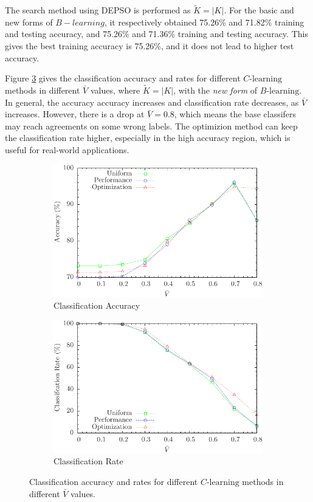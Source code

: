 The search method using DEPSO is performed as $\tilde{K}=|K|$. For the basic and new forms of $B-learning$, it respectively obtained 75.26\% and 71.82\% training and testing accuracy, and 75.26\% and 71.36\% training and testing accuracy. This gives the best training accuracy is 75.26\%, and it does not lead to higher test accuracy. 

Figure \ref{fig:threshoulds} gives the classification accuracy and rates for different $C\text{-learning}$ methods in different $\bar{V}$ values, where $\tilde{K}=|K|$, with the \emph{new form} of $B\text{-learning}$. In general, the accuracy accuracy increases and classification rate decreases, as $\bar{V}$ increases. However, there is a drop at $\bar{V}=0.8$, which means the base classifers may reach agreements on some wrong labels. The optimizion method can keep the classification rate higher, especially in the high accuracy region, which is useful for real-world applications.

\begin{figure} [t]
\centering
\begin{subfigure}{.45\textwidth}
  \centering
  \includegraphics[width=.95\linewidth]{../Figure/threshould_accuracy}
  \caption{Classification Accuracy}
  \label{fig:threshould_accuracy}
\end{subfigure}%
\begin{subfigure}{.45\textwidth}
  \centering
  \includegraphics[width=.95\linewidth]{../Figure/threshould_rate}
  \caption{Classification Rate}
  \label{fig:threshould_rate}
\end{subfigure}
\caption{Classification accuracy and rates for different $C\text{-learning}$ methods in different $\bar{V}$ values.}
\label{fig:threshoulds}
\end{figure}

